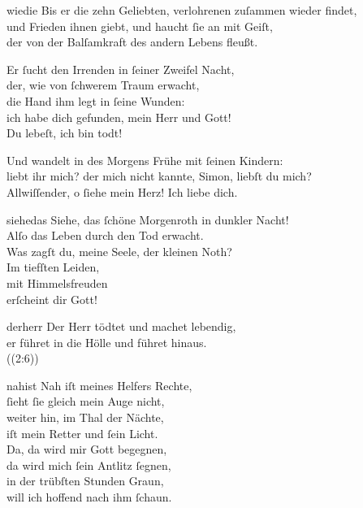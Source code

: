 \documentclass[tocstyle=ref-genre]{ees}
\begin{document}
{\begin{movement}{wiedie}
  \voice[Tenore I]
  Bis er die zehn Geliebten, verlohrenen zuſammen wieder findet,\\
  und Frieden ihnen giebt, und haucht ſie an mit Geiſt,\\
  der von der Balſamkraft des andern Lebens fleußt.

  \voice[Tenore II]
  Er ſucht den Irrenden in ſeiner Zweifel Nacht,\\
  der, wie von ſchwerem Traum erwacht,\\
  die Hand ihm legt in ſeine Wunden:\\
  ich habe dich gefunden, mein Herr und Gott!\\
  Du lebeſt, ich bin todt!

  \voice[Tenore I]
  Und wandelt in des Morgens Frühe mit ſeinen Kindern:\\
  liebt ihr mich? der mich nicht kannte, Simon, liebſt du mich?\\
  Allwiſſender, o ſiehe mein Herz! Ich liebe dich.
\end{movement}

\begin{movement}{siehedas}
  \voice[Soprano {[I]}]
  Siehe, das ſchöne Morgenroth in dunkler Nacht!\\
  Alſo das Leben durch den Tod erwacht.\\
  Was zagſt du, meine Seele, der kleinen Noth?\\
  Im tiefſten Leiden,\\
  mit Himmelsfreuden\\
  erſcheint dir Gott!
\end{movement}

\begin{movement}{derherr}
  \voice[Coro]
  Der Herr tödtet und machet lebendig,\\
  er führet in die Hölle und führet hinaus.\\
  ((2:6))
\end{movement}

\begin{movement}{nahist}
  \voice[Coro]
  Nah iſt meines Helfers Rechte,\\
  ſieht ſie gleich mein Auge nicht,\\
  weiter hin, im Thal der Nächte,\\
  iſt mein Retter und ſein Licht.\\
  Da, da wird mir Gott begegnen,\\
  da wird mich ſein Antlitz ſegnen,\\
  in der trübſten Stunden Graun,\\
  will ich hoffend nach ihm ſchaun.
\end{movement}

}
\end{document}
